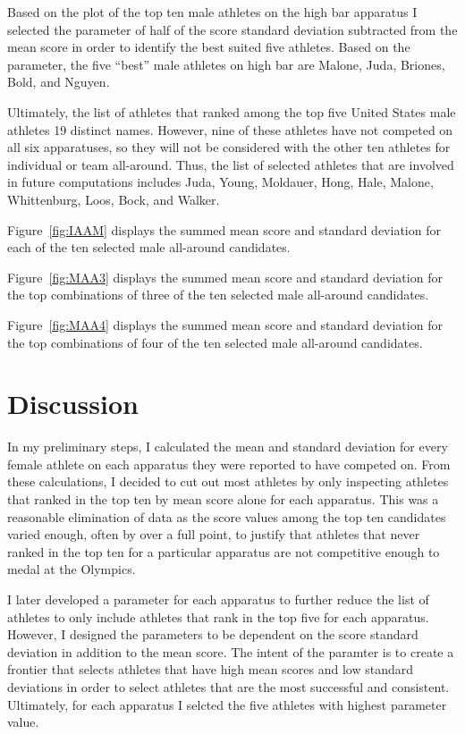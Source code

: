 \documentclass[12pt]{article}
\begin{document}
  Based on the plot of the top ten male athletes on the high bar apparatus I selected the parameter of 
  half of the score standard deviation subtracted from the mean score in order to identify the best suited five 
  athletes. Based on the parameter, the five ``best'' male athletes on high bar are Malone, Juda, Briones, Bold, and 
  Nguyen.

  Ultimately, the list of athletes that ranked among the top five United States male athletes 19 distinct 
  names. However, nine of these athletes have not competed on all six apparatuses, so they will not be considered 
  with the other ten athletes for individual or team all-around. Thus, the list of selected athletes that 
  are involved in future computations includes Juda, Young, Moldauer, Hong, Hale, Malone, Whittenburg, Loos, 
  Bock, and Walker.

  Figure~\ref{fig:IAAM} displays the summed mean score and standard deviation 
  for each of the ten selected male all-around candidates.


  Figure~\ref{fig:MAA3} displays the summed mean score and standard deviation 
  for the top combinations of three of the ten selected male all-around candidates.
  

  Figure~\ref{fig:MAA4} displays the summed mean score and standard deviation 
  for the top combinations of four of the ten selected male all-around candidates.

\section{Discussion}
\label{sec:dis}

In my preliminary steps, I calculated the mean and standard deviation for every female athlete on each 
apparatus they were reported to have competed on. From these calculations, I decided to cut out most athletes 
by only inspecting athletes that ranked in the top ten by mean score alone for each apparatus. This was a 
reasonable elimination of data as the score values among the top ten candidates varied enough, often by over a 
full point, to justify that athletes that never ranked in the top ten for a particular apparatus are not 
competitive enough to medal at the Olympics.

I later developed a parameter for each apparatus to further reduce the list of athletes to only include athletes 
that rank in the top five for each apparatus. However, I designed the parameters to be dependent on the score 
standard deviation in addition to the mean score. The intent of the paramter is to create a frontier that selects 
athletes that have high mean scores and low standard deviations in order to select athletes that are the most 
successful and consistent. Ultimately, for each apparatus I selcted the five athletes with highest parameter value.
\end{document}
